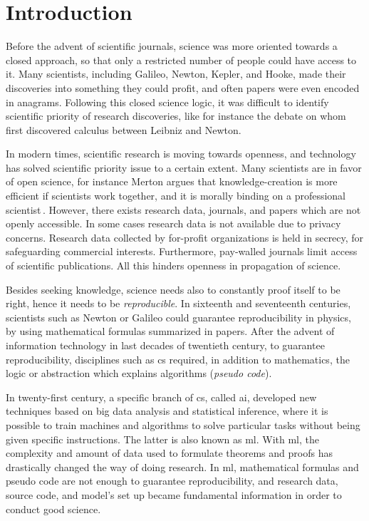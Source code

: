 \section{Introduction}
Before the advent of scientific journals,
science was more oriented towards a closed approach, so that only a restricted number
of people could have access to it.
Many scientists, including Galileo, Newton, Kepler, and Hooke, made their discoveries into
something they could profit, and often papers were even encoded in anagrams.
Following this closed science logic, it was difficult
to identify scientific priority of research discoveries, like for instance the
debate on whom first discovered calculus between Leibniz and Newton.

In modern times, scientific research is moving towards openness,
and technology has solved scientific priority issue to a certain extent.
Many scientists are in favor of open science, for instance
Merton argues that knowledge-creation is more efficient if scientists work together, and
it is morally binding on a professional scientist\,\cite{merton1942science}.
However, there exists research data, journals, and papers which are not openly accessible.
In some cases research data is not available due to privacy concerns.
Research data collected by for-profit organizations is held in secrecy, for
safeguarding commercial interests.
Furthermore, pay-walled journals limit access of scientific publications.
All this hinders openness in propagation of science.

Besides seeking knowledge, science needs also to constantly proof itself
to be right, hence it needs to be \emph{reproducible}. 
In sixteenth and seventeenth centuries, scientists such as Newton or Galileo could guarantee
reproducibility in physics, by using mathematical formulas summarized in papers.
%
After the advent of information technology in last decades of twentieth century, to guarantee reproducibility,
disciplines such as \ac{cs} required, in addition to mathematics, the logic or abstraction
which explains algorithms (\emph{pseudo code}).

In twenty-first century, a specific branch of \ac{cs}, called \ac{ai}, developed
new techniques based on big data analysis and statistical inference,
where it is possible to train machines and algorithms to solve particular tasks without being
given specific instructions. The latter is also known as \ac{ml}.
%
With \ac{ml}, the complexity and amount of data used
to formulate theorems and proofs has drastically changed the way of doing research.
In \ac{ml}, mathematical formulas and pseudo code are not
enough to guarantee reproducibility, and research data, source code,
and model's set up became fundamental information in order to conduct good science.

